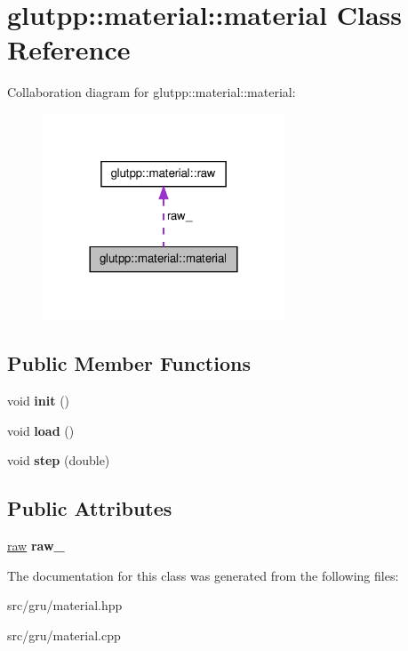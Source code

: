 \hypertarget{classglutpp_1_1material_1_1material}{\section{glutpp\-:\-:material\-:\-:material \-Class \-Reference}
\label{classglutpp_1_1material_1_1material}
}


\-Collaboration diagram for glutpp\-:\-:material\-:\-:material\-:
\nopagebreak
\begin{figure}[H]
\begin{center}
\leavevmode
\includegraphics[width=204pt]{classglutpp_1_1material_1_1material__coll__graph}
\end{center}
\end{figure}
\subsection*{\-Public \-Member \-Functions}
\begin{DoxyCompactItemize}
\item 
\hypertarget{classglutpp_1_1material_1_1material_a5610c4dc9129ecc5fa6b28814fcf147e}{void {\bfseries init} ()}\label{classglutpp_1_1material_1_1material_a5610c4dc9129ecc5fa6b28814fcf147e}

\item 
\hypertarget{classglutpp_1_1material_1_1material_a70897de59b78a8fbd8ddf85e92385e98}{void {\bfseries load} ()}\label{classglutpp_1_1material_1_1material_a70897de59b78a8fbd8ddf85e92385e98}

\item 
\hypertarget{classglutpp_1_1material_1_1material_ae2b179fde85146dc1d8b0ca98e92cb7e}{void {\bfseries step} (double)}\label{classglutpp_1_1material_1_1material_ae2b179fde85146dc1d8b0ca98e92cb7e}

\end{DoxyCompactItemize}
\subsection*{\-Public \-Attributes}
\begin{DoxyCompactItemize}
\item 
\hypertarget{classglutpp_1_1material_1_1material_a345a3b15781a4e72450ce0fac04d7b88}{\hyperlink{structglutpp_1_1material_1_1raw}{raw} {\bfseries raw\-\_\-}}\label{classglutpp_1_1material_1_1material_a345a3b15781a4e72450ce0fac04d7b88}

\end{DoxyCompactItemize}


\-The documentation for this class was generated from the following files\-:\begin{DoxyCompactItemize}
\item 
src/gru/material.\-hpp\item 
src/gru/material.\-cpp\end{DoxyCompactItemize}
